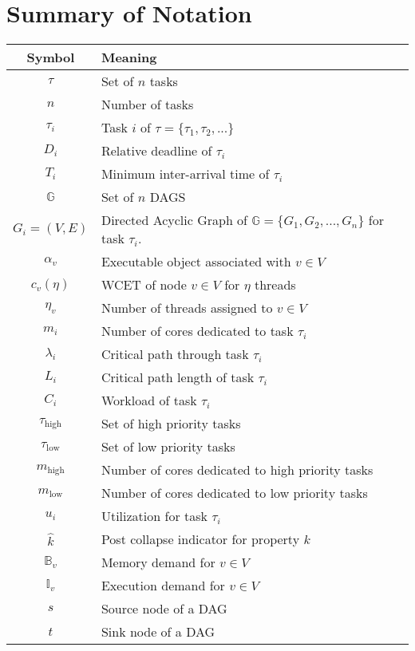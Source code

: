 \section{Summary of Notation}
\begin{table}[ht]
  \begin{tabular}{|c|l|}
    \hline
    \textbf{Symbol} & \textbf{Meaning} \\
    \hline
    ${\tau}$ & Set of ${n}$ tasks \\
    \hline
    ${n}$ & Number of tasks \\
    \hline
    ${\tau_i}$ & Task ${i}$ of ${\tau = \{\tau_1, \tau_2, ... \}}$ \\
    \hline
    ${D_i}$ & Relative deadline of ${\tau_i}$ \\
    \hline
    ${T_i}$ & Minimum inter-arrival time of ${\tau_i}$ \\
    \hline
    ${\mathbb{G}}$ & Set of ${n}$ DAGS \\
    \hline
    ${G_i = (V, E)}$ & Directed Acyclic Graph of
        ${\mathbb{G} = \{G_1, G_2, ..., G_n\}}$ for task ${\tau_i}$. \\
    \hline
    ${\alpha_v}$ & Executable object associated with ${v \in V}$
    \\
    \hline
    ${c_v(\eta)}$ &  WCET of node ${v \in V}$ for ${\eta}$ threads
    \\
    \hline
    ${\eta_v}$ & Number of threads assigned to ${v \in V}$ \\
    \hline
    ${m_i}$ & Number of cores dedicated to task ${\tau_i}$ \\
    \hline
    ${\lambda_i}$ & Critical path through task ${\tau_i}$ \\
    \hline
    ${L_i}$ & Critical path length of task ${\tau_i}$ \\
    \hline
    ${C_i}$ & Workload of task ${\tau_i}$ \\
    \hline
    ${\tau_{\text{high}}}$ & Set of high priority tasks \\
    \hline
    ${\tau_{\text{low}}}$ & Set of low priority tasks \\
    \hline
    ${m_{\text{high}}}$ & Number of cores dedicated to high
    priority tasks \\
    \hline
    ${m_{\text{low}}}$ & Number of cores dedicated to low priority
    tasks \\
    \hline
    ${u_i}$ & Utilization for task ${\tau_i}$ \\
    \hline
    ${\hat{k}}$ & Post collapse indicator for property ${k}$ \\
    \hline
    ${\mathbb{B}_v}$ & Memory demand for ${v \in V}$ \\
    \hline
    ${\mathbb{I}_v}$ & Execution demand for ${v \in V}$ \\
    \hline
    ${s}$ & Source node of a DAG \\
    \hline
    ${t}$ & Sink node of a DAG \\
    \hline
  \end{tabular}
\end{table}
